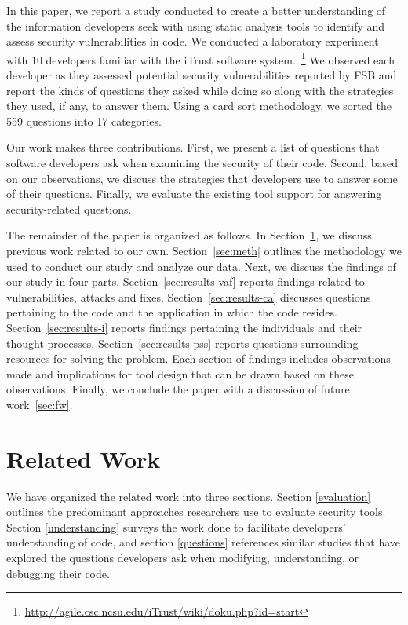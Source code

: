 \documentclass[conference]{IEEEtran}
\begin{document}
In this paper, we report a study conducted to create a better understanding of the information developers seek with using static analysis tools to identify and assess security vulnerabilities in code.
We conducted a laboratory experiment with 10 developers familiar with the iTrust software system.~\footnote{\url{http://agile.csc.ncsu.edu/iTrust/wiki/doku.php?id=start}} 
We observed each developer as they assessed potential security vulnerabilities reported by FSB and report the kinds of questions they asked while doing so along with the strategies they used, if any, to answer them.
Using a card sort methodology, we sorted the 559 questions into 17 categories. 

Our work makes three contributions. 
First, we present a list of questions that software developers ask when examining the security of their code.
Second, based on our observations, we discuss the strategies that developers use to answer some of their questions.
Finally, we evaluate the existing tool support for answering security-related questions.

The remainder of the paper is organized as follows. 
In Section~\ref{sec:rw}, we discuss previous work related to our own. 
Section~\ref{sec:meth} outlines the methodology we used to conduct our study and analyze our data. 
Next, we discuss the findings of our study in four parts. 
Section~\ref{sec:results-vaf} reports findings related to vulnerabilities, attacks and fixes. 
Section~\ref{sec:results-ca} discusses questions pertaining to the code and the application in which the code resides.
Section~\ref{sec:results-i} reports findings pertaining the individuals and their thought processes.
Section~\ref{sec:results-pss} reports questions surrounding resources for solving the problem.
Each section of findings includes observations made and implications for tool design that can be drawn based on these observations. 
Finally, we conclude the paper with a discussion of future work~\ref{sec:fw}.







\section{Related Work}
\label{sec:rw}

We have organized the related work into three sections. Section \ref{evaluation} outlines the predominant approaches researchers use to evaluate security tools. 
Section \ref{understanding} surveys the work done to facilitate developers' understanding of code, and section \ref{questions} references similar studies that have explored the questions developers ask when modifying, understanding, or debugging their code.
\end{document}
